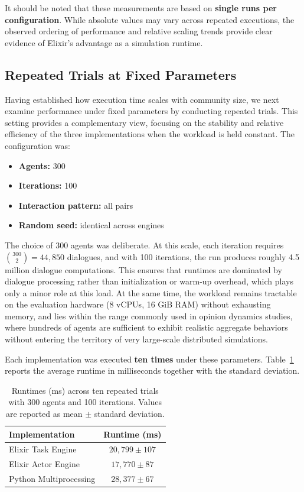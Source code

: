 \documentclass[
]{ceurart}
\begin{document}
It should be noted that these measurements are based on \textbf{single runs per configuration}. While absolute values may vary across repeated executions, the observed ordering of performance and relative scaling trends provide clear evidence of Elixir’s advantage as a simulation runtime.


\subsection{Repeated Trials at Fixed Parameters}
Having established how execution time scales with community size, we next examine performance under fixed parameters by conducting repeated trials. This setting provides a complementary view, focusing on the stability and relative efficiency of the three implementations when the workload is held constant. The configuration was:

\begin{itemize}
	\item \textbf{Agents:} 300
	\item \textbf{Iterations:} 100
	\item \textbf{Interaction pattern:} all pairs
	\item \textbf{Random seed:} identical across engines
\end{itemize}

The choice of 300 agents was deliberate. At this scale, each iteration requires $\binom{300}{2} = 44{,}850$ dialogues, and with 100 iterations, the run produces roughly 4.5 million dialogue computations. This ensures that runtimes are dominated by dialogue processing rather than initialization or warm-up overhead, which plays only a minor role at this load. At the same time, the workload remains tractable on the evaluation hardware (8 vCPUs, 16 GiB RAM) without exhausting memory, and lies within the range commonly used in opinion dynamics studies, where hundreds of agents are sufficient to exhibit realistic aggregate behaviors without entering the territory of very large-scale distributed simulations.


Each implementation was executed \textbf{ten times} under these parameters. Table~\ref{tab:runtime_trials} reports the average runtime in milliseconds together with the standard deviation.

\begin{table}[ht]
\centering
\caption{Runtimes (ms) across ten repeated trials with 300 agents and 100 iterations.
Values are reported as mean $\pm$ standard deviation.}\label{tab:runtime_trials}
\begin{tabular}{lc}
\toprule
Implementation & Runtime (ms) \\
\midrule
Elixir Task Engine & $20,799 \pm 107$ \\
Elixir Actor Engine & $17,770 \pm 87$ \\ 
Python Multiprocessing & $28,377 \pm 67$ \\
\bottomrule
\end{tabular}
\end{table}
\end{document}
